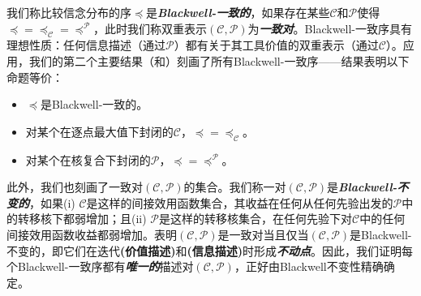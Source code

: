 \documentclass[12pt,letterpaper]{article}
\newenvironment{translation}{\color{blue}}{}
\theoremstyle{plain}
\theoremstyle{definition}
\theoremstyle{remark}
\newcommand{\Pc}{\mathcal{P}}
\newcommand{\C}{\mathcal{C}}
\theoremstyle{definition}
\begin{document}
\begin{translation}
我们称比较信念分布的序$\preceq$是\textit{\textbf{Blackwell-一致的}}，如果存在某些$\C$和$\Pc$使得$\preceq = \preceq_\C = \preceq^{\Pc}$，此时我们称双重表示$(\C, \Pc)$为\textit{\textbf{一致对}}。Blackwell-一致序具有理想性质：任何信息描述（通过$\Pc$）都有关于其工具价值的双重表示（通过$\C$）。应用，我们的第二个主要结果（和）刻画了所有Blackwell-一致序——结果表明以下命题等价：
\begin{itemize}
    \item[(a)] $\preceq$是Blackwell-一致的。
    \item[(b)] 对某个在逐点最大值下封闭的$\C$，$\preceq = \preceq_\C$。
    \item[(c)] 对某个在核复合下封闭的$\Pc$，$\preceq = \preceq^\Pc$。
\end{itemize}
此外，我们也刻画了一致对$(\C, \Pc)$的集合。我们称一对$(\C, \Pc)$是\textit{\textbf{Blackwell-不变的}}，如果(i) $\C$是这样的间接效用函数集合，其收益在任何从任何先验出发的$\Pc$中的转移核下都弱增加；且(ii) $\Pc$是这样的转移核集合，在任何先验下对$\C$中的任何间接效用函数收益都弱增加。表明$(\C, \Pc)$是一致对当且仅当$(\C, \Pc)$是Blackwell-不变的，即它们在迭代\textbf{(价值描述)}和\textbf{(信息描述)}时形成\textit{\textbf{不动点}}。因此，我们证明每个Blackwell-一致序都有\textit{\textbf{唯一的}}描述对$(\C, \Pc)$，正好由Blackwell不变性精确确定。
\end{translation}
\end{document}
